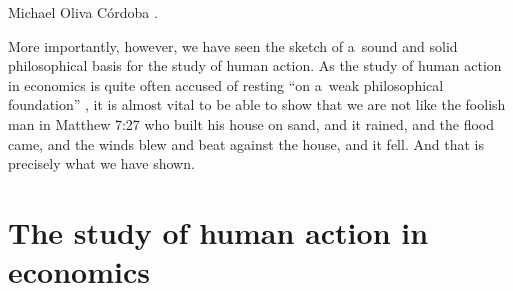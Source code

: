 \begin{artengenv}{Michael Oliva Córdoba}
\parencites[cf.][]{condic_hayek_2021}[][p.94]{rajagopalan_austrian_2019}[][]{knudsen_alfred_2004}[][]{yeager_mises_1994}[][p.63f.]{herbener_economic_1993}[][p.23ff.]{boettke_political_1990}[][p.50]{lavoie_rivalry_2015}[][]{hayek_use_1945}[][p.33]{hayek_economics_1948}[][98f]{schutz_political_1996}. %

 More importantly, however, we have seen the sketch of a~sound and solid philosophical basis for the study of human action. As the study of human action in economics is quite often accused of resting ``on a~weak philosophical foundation'' 
\parencite[cf.][p.65]{barrotta_neo-kantian_1996}, %
 it is almost vital to be able to show that we are not like the foolish man in Matthew 7:27 who built his house on sand, and it rained, and the flood came, and the winds blew and beat against the house, and it fell. And that is precisely what we have shown.



\section{The study of human action in economics}


\end{artengenv}
